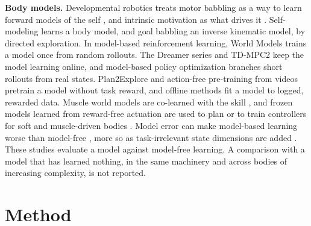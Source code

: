 \documentclass[journal]{IEEEtran}
\begin{document}
\textbf{Body models.} Developmental robotics \cite{lungarella2003,asada2009,cangelosi2015}
treats motor babbling as a way to learn forward models of the self
\cite{dearden2005}, and intrinsic motivation as what drives it
\cite{oudeyer2007}. Self-modeling \cite{bongard2006} learns a body model, and
goal babbling \cite{rolf2010} an inverse kinematic model, by directed
exploration. In model-based
reinforcement learning, World Models \cite{ha2018} trains a model once from
random rollouts. The Dreamer series \cite{hafner2020,hafner2021,hafner2025} and
TD-MPC2 \cite{hansen2024} keep the model learning online, and model-based policy optimization
\cite{janner2019} branches short rollouts from real states. Plan2Explore
\cite{sekar2020} and action-free pre-training from videos \cite{seo2022} pretrain a model without task reward, and
offline methods \cite{kidambi2020,yu2020,yu2021} fit a model to logged,
rewarded data. Muscle world models are co-learned with the skill
\cite{feng2023,kim2025}, and frozen models learned from reward-free actuation
are used to plan or to train controllers for soft and muscle-driven bodies
\cite{berdica2024,wu2024modex,zheng2025}. Model error can make model-based
learning worse than model-free \cite{janner2019,voelcker2022}, more so as
task-irrelevant state dimensions are added \cite{voelcker2022}. These studies evaluate a model against
model-free learning. A comparison with a model that has learned nothing, in the
same machinery and across bodies of increasing complexity, is not reported.

\section{Method}
\end{document}
